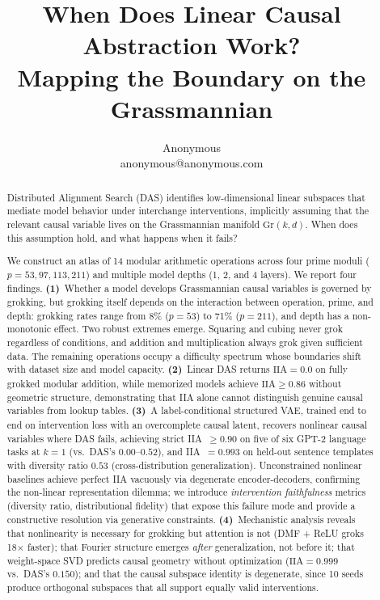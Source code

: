 \documentclass{article}
\title{When Does Linear Causal Abstraction Work?\\
Mapping the Boundary on the Grassmannian}
\author{
\name Anonymous \\
\email anonymous@anonymous.com
}
\newcommand{\Gr}{\mathrm{Gr}}
\newcommand{\IIA}{\mathrm{IIA}}
\begin{document}
\maketitle

\begin{abstract}
Distributed Alignment Search (DAS) identifies low-dimensional linear subspaces
that mediate model behavior under interchange interventions, implicitly assuming
that the relevant causal variable lives on the Grassmannian manifold
$\Gr(k,d)$. When does this assumption hold, and what happens when it fails?

We construct an atlas of 14 modular arithmetic operations across four prime
moduli ($p = 53, 97, 113, 211$) and multiple model depths (1, 2, and 4
layers). We report four findings.
\textbf{(1)}~Whether a model develops Grassmannian causal variables is
governed by grokking, but grokking itself depends on the interaction between
operation, prime, and depth: grokking rates range from 8\% ($p{=}53$) to
71\% ($p{=}211$), and depth has a non-monotonic effect. Two robust extremes emerge. Squaring and cubing never grok regardless of
conditions, and addition and multiplication always grok given sufficient data.
The remaining operations occupy a difficulty spectrum whose boundaries shift with
dataset size and model capacity.
\textbf{(2)}~Linear DAS returns $\IIA = 0.0$ on fully grokked modular
addition, while memorized models achieve $\IIA \geq 0.86$ without geometric
structure, demonstrating that IIA alone cannot distinguish genuine causal
variables from lookup tables.
\textbf{(3)}~A label-conditional structured VAE, trained end to end on intervention loss with
an overcomplete causal latent, recovers nonlinear causal variables where DAS
fails, achieving strict IIA~$\geq 0.90$ on five of six GPT-2
language tasks at $k{=}1$ (vs.\ DAS's $0.00$--$0.52$), and
IIA~$= 0.993$ on held-out sentence templates with diversity ratio $0.53$
(cross-distribution generalization). Unconstrained
nonlinear baselines achieve perfect IIA vacuously via degenerate
encoder-decoders, confirming the non-linear representation dilemma; we
introduce \emph{intervention faithfulness} metrics (diversity ratio,
distributional fidelity) that expose this failure mode and provide a
constructive resolution via generative constraints.
\textbf{(4)}~Mechanistic analysis reveals that nonlinearity is necessary for
grokking but attention is not (DMF + ReLU groks 18$\times$ faster); that
Fourier structure emerges \emph{after} generalization, not before it; that
weight-space SVD predicts causal geometry without optimization
($\IIA = 0.999$ vs.\ DAS's $0.150$); and that the causal subspace identity is degenerate, since 10 seeds produce orthogonal
subspaces that all support equally valid interventions.
\end{abstract}
\end{document}
